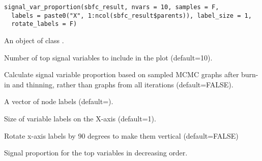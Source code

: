\documentclass[a4paper]{book}
\begin{document}
%
\begin{Usage}
\begin{verbatim}
signal_var_proportion(sbfc_result, nvars = 10, samples = F,
  labels = paste0("X", 1:ncol(sbfc_result$parents)), label_size = 1,
  rotate_labels = F)
\end{verbatim}
\end{Usage}
%
\begin{Arguments}
\begin{ldescription}
\item[\code{sbfc\_result}] An object of class .

\item[\code{nvars}] Number of top signal variables to include in the plot (default=10).

\item[\code{samples}] Calculate signal variable proportion based on sampled MCMC graphs after burn-in and thinning,
rather than graphs from all iterations (default=FALSE).

\item[\code{labels}] A vector of node labels (default=).

\item[\code{label\_size}] Size of variable labels on the X-axis (default=1).

\item[\code{rotate\_labels}] Rotate x-axis labels by 90 degrees to make them vertical (default=FALSE)
\end{ldescription}
\end{Arguments}
%
\begin{Value}
Signal proportion for the top  variables in decreasing order.
\end{Value}
\printindex{}
\end{document}
